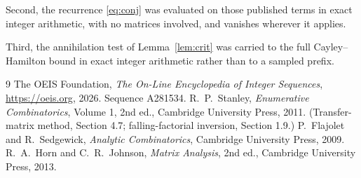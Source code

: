 \documentclass[11pt,a4paper]{article}
\theoremstyle{plain}
\theoremstyle{definition}
\begin{document}
Second, the recurrence \eqref{eq:conj} was evaluated on those published terms in exact
integer arithmetic, with no matrices involved, and vanishes wherever it applies.

Third, the annihilation test of Lemma~\ref{lem:crit} was carried to the full
Cayley--Hamilton bound in exact integer arithmetic rather than to a sampled prefix.

\begin{thebibliography}{9}
 The OEIS Foundation, \emph{The On-Line Encyclopedia of Integer
Sequences}, \url{https://oeis.org}, 2026. Sequence A281534.
 R.~P.~Stanley, \emph{Enumerative Combinatorics}, Volume 1, 2nd ed.,
Cambridge University Press, 2011. (Transfer-matrix method, Section 4.7; falling-factorial
inversion, Section 1.9.)
 P.~Flajolet and R.~Sedgewick, \emph{Analytic Combinatorics}, Cambridge
University Press, 2009.
 R.~A.~Horn and C.~R.~Johnson, \emph{Matrix Analysis}, 2nd ed., Cambridge
University Press, 2013.
\end{thebibliography}
\end{document}
